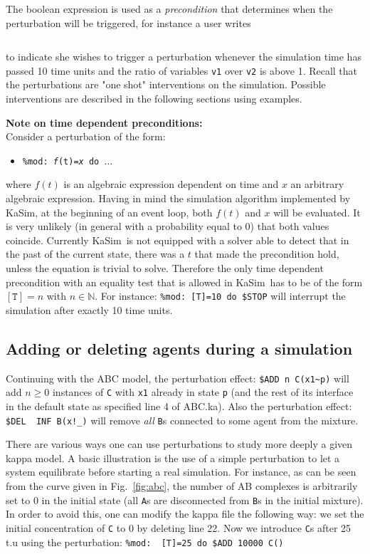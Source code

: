 \documentclass[11pt]{book}
\def\KaSim{\textsf{KaSim}}
\def\ttt#1{\texttt{#1}}
\def\ITE#1{\begin{itemize}#1\end{itemize}}
\def\Nat{\mathbb N}
\begin{document}
The boolean expression is used as a \textit{precondition} that determines when the perturbation will be triggered, for instance a user writes
\begin{lstlisting}[language=kappa]
%mod: ([T]>10) && ('v1' /'v2') > 1 do ...
\end{lstlisting}
to indicate she wishes to trigger a perturbation whenever the simulation time has passed 10 time units and the ratio of variables \ttt{v1} over \ttt{v2} is above 1. Recall that the perturbations are "one shot" interventions on the simulation. Possible interventions are described in the following sections using examples.

\textbf{Note on time dependent preconditions:}
\\Consider a perturbation of the form:
\ITE{
\item[] \ttt{\%mod: {\it f}(t)={\it x} do $\dots$}
}
where $f(t)$ is an algebraic expression dependent on time and $x$ an arbitrary algebraic expression. Having in mind the simulation algorithm implemented by \KaSim, at the beginning of an event loop, both $f(t)$ and $x$ will be evaluated. It is very unlikely (in general with a probability equal to 0) that both values coincide. Currently \KaSim~is not equipped with a solver able to detect that in the past of the current state, there was a $t$ that made the precondition hold, unless the equation is trivial to solve. Therefore the only time dependent precondition with an equality test that is allowed in \KaSim~has to be of the form $\mathtt{[T]=}n$ with $n\in\Nat$. For instance:
\lstinline[language=kappa]*%mod: [T]=10 do $STOP*
will interrupt the simulation after exactly 10 time units.

 
\subsection{Adding or deleting agents during a simulation}

Continuing with the ABC model, the perturbation effect: 
\lstinline[language=kappa]*$ADD n C(x1~p)*
will add $n\geq 0$ instances of \ttt{C} with \ttt{x1} already in state \ttt{p} (and the rest of its interface in the default state as specified line 4 of ABC.ka). Also the perturbation effect:
\lstinline[language=kappa]*$DEL  INF B(x!_)*
will remove \emph{all} \ttt{B}s connected to some agent from the mixture. 

There are various ways one can use perturbations to study more deeply a given kappa model. A basic illustration is the use of a simple perturbation to let a system equilibrate before starting a real simulation. For instance, as can be seen from the curve given in Fig.~\ref{fig:abc}, the number of AB complexes is arbitrarily set to 0 in the initial state (all \ttt{A}s are disconnected from \ttt{B}s in the initial mixture). In order to avoid this, one can modify the kappa file the following way: we set the initial concentration of \ttt{C} to 0 by deleting line 22. Now we introduce \ttt{C}s after 25 t.u using the perturbation:
\lstinline[language=kappa]*%mod:  [T]=25 do $ADD 10000 C()*
\end{document}
